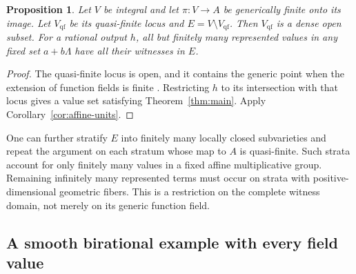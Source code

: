\documentclass[11pt,a4paper]{article}
\newtheorem{proposition}[theorem]{Proposition}
\theoremstyle{definition}
\begin{document}
\begin{proposition}\label{prop:exceptional}
Let $V$ be integral and let $\pi:V\to A$ be generically finite
onto its image. Let $V_{\mathrm{qf}}$ be its quasi-finite locus and
$E=V\setminus V_{\mathrm{qf}}$. Then $V_{\mathrm{qf}}$ is a dense
open subset. For a rational output $h$, all but finitely many
represented values in any fixed set $a+b\Lambda$ have all their
witnesses in $E$.
\end{proposition}
\begin{proof}
The quasi-finite locus is open, and it contains the generic point
when the extension of function fields is finite
\cite[Tag 02FW]{Stacks}. Restricting $h$ to its intersection with
that locus gives a value set satisfying Theorem~\ref{thm:main}.
Apply Corollary~\ref{cor:affine-units}.
\end{proof}

One can further stratify $E$ into finitely many locally closed
subvarieties and repeat the argument on each stratum whose map to
$A$ is quasi-finite. Such strata account for only finitely many
values in a fixed affine multiplicative group. Remaining infinitely
many represented terms must occur on strata with positive-dimensional
geometric fibers. This is a restriction on the complete witness
domain, not merely on its generic function field.

\subsection{A smooth birational example with every field value}
\end{document}
